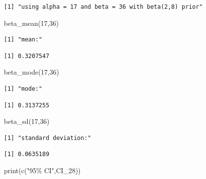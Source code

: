 \documentclass[
  letterpaper,
  DIV=11,
  numbers=noendperiod]{scrartcl}
\newenvironment{Shaded}{\begin{snugshade}}{\end{snugshade}}
\newcommand{\DecValTok}[1]{\textcolor[rgb]{0.68,0.00,0.00}{#1}}
\newcommand{\FunctionTok}[1]{\textcolor[rgb]{0.28,0.35,0.67}{#1}}
\newcommand{\NormalTok}[1]{\textcolor[rgb]{0.00,0.23,0.31}{#1}}
\newcommand{\StringTok}[1]{\textcolor[rgb]{0.13,0.47,0.30}{#1}}
\begin{document}
\begin{verbatim}
[1] "using alpha = 17 and beta = 36 with beta(2,8) prior"
\end{verbatim}

\begin{Shaded}
\begin{Highlighting}[]
\FunctionTok{beta\_mean}\NormalTok{(}\DecValTok{17}\NormalTok{,}\DecValTok{36}\NormalTok{)}
\end{Highlighting}
\end{Shaded}

\begin{verbatim}
[1] "mean:"
\end{verbatim}

\begin{verbatim}
[1] 0.3207547
\end{verbatim}

\begin{Shaded}
\begin{Highlighting}[]
\FunctionTok{beta\_mode}\NormalTok{(}\DecValTok{17}\NormalTok{,}\DecValTok{36}\NormalTok{)}
\end{Highlighting}
\end{Shaded}

\begin{verbatim}
[1] "mode:"
\end{verbatim}

\begin{verbatim}
[1] 0.3137255
\end{verbatim}

\begin{Shaded}
\begin{Highlighting}[]
\FunctionTok{beta\_sd}\NormalTok{(}\DecValTok{17}\NormalTok{,}\DecValTok{36}\NormalTok{)}
\end{Highlighting}
\end{Shaded}

\begin{verbatim}
[1] "standard deviation:"
\end{verbatim}

\begin{verbatim}
[1] 0.0635189
\end{verbatim}

\begin{Shaded}
\begin{Highlighting}[]
\FunctionTok{print}\NormalTok{(}\FunctionTok{c}\NormalTok{(}\StringTok{"95\% CI"}\NormalTok{,CI\_28))}
\end{Highlighting}
\end{Shaded}
\end{document}
